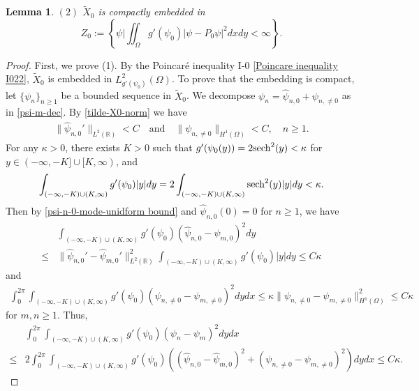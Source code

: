 \documentclass[1 [leqno, 11pt]{amsart}
\numberwithin{equation}{section}
\def\sech{{\rm{sech}}}
\newtheorem{lemma}[Theorem]{Lemma}
\begin{document}
\begin{CJK*}{GBK}{song}
\begin{lemma}
 $ (2)$ $\tilde X_0$ is compactly embedded in
 \begin{equation*}
 Z_{0}:=\left\{\psi\bigg|\iint_{\Omega}g'(\psi_0)|\psi-P_0\psi|^2dxdy<\infty\right\}.
  \end{equation*}
\end{lemma}


\begin{proof} First, we prove (1).
By the Poincar\'e inequality I-$0$ \eqref{Poincare inequality I022}, $\tilde X_0$ is embedded in $L_{g'(\psi_0)}^2(\Omega)$. To prove that the embedding is compact, let $\{\psi_n\}_{n\geq1}$ be a bounded sequence in $\tilde{X}_0$. We decompose $\psi_n=\widehat{\psi}_{n,0}+\psi_{n,{\neq0}}$ as in \eqref{psi-m-dec}.  By  \eqref{tilde-X0-norm} we have
 \begin{align}\label{psi-n-0-mode-unidform bound}
 \|\widehat{\psi}_{n,0}'\|_{L^2(\mathbb{R})}<C \quad\text{and} \quad\|\psi_{n,{\neq0}}\|_{H^1(\Omega)}<C,\quad n\geq1.
 \end{align}
For any $\kappa > 0$, there exists $K>0$ such that $g'(\psi_0(y))=2\sech^2(y)<\kappa$ for $y\in (-\infty,-K]\cup[K,\infty)$, and
 \begin{align*}
 \int_{(-\infty, -K)\cup(K,\infty)}g'(\psi_0)|y|dy =2\int_{(-\infty, -K)\cup(K,\infty)} \sech^2(y)|y|dy <\kappa.
 \end{align*}
  Then by \eqref{psi-n-0-mode-unidform bound} and $\widehat{\psi}_{n,0}(0)=0$ for $n\geq1$, we have
\begin{align*}
&\int_{(-\infty, -K)\cup(K,\infty)}g'(\psi_0)(\widehat{\psi}_{n,0}-\widehat{\psi}_{m,0})^2d y\\
 \leq& \|\widehat{\psi}_{n,0}'-\widehat{\psi}_{m,0}'\|_{L^2(\mathbb{R})}^2\int_{(-\infty, -K)\cup(K,\infty)}g'(\psi_0)|y|dy \leq C\kappa
\end{align*}
and
\begin{align*}
\int_0^{2\pi}\int_{(-\infty, -K)\cup(K,\infty)} g'(\psi_0) (\psi_{n,{\neq 0}}-\psi_{m,{\neq 0}})^2 dydx \leq  \kappa \| \psi_{n,{\neq 0}} - \psi_{m,{\neq 0}}\|_{H^1(\Omega)}^2 \leq C \kappa
\end{align*}
for $m,n\geq1$.
Thus,
\begin{align*}
&\int_0 ^ {2\pi} \int_{(-\infty, -K)\cup(K,\infty)} g'(\psi_0) (\psi_n -\psi_m)^2 dydx \\
\leq&2\int_0 ^ {2\pi} \int_{(-\infty, -K)\cup(K,\infty)} g'(\psi_0) \left((\widehat{\psi}_{n,0}-\widehat{\psi}_{m,0})^2+ (\psi_{n,{\neq 0}}-\psi_{m,{\neq 0}})^2 \right)dydx\leq C \kappa.
\end{align*}

\end{proof}
\end{CJK*}
\end{document}
